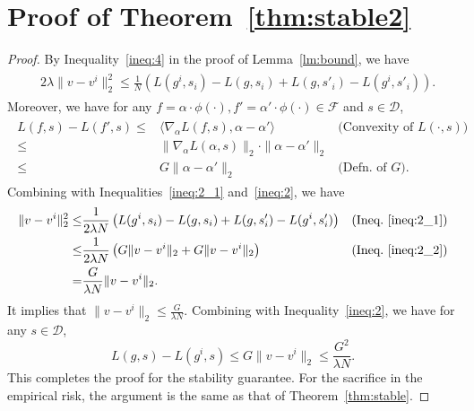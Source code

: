 \documentclass[11pt]{article}
\newcommand{\calD}{\mathcal{D}}
\newcommand{\calF}{\mathcal{F}}
\begin{document}
	
	
	
	
	\appendix
	
	\section{Proof of Theorem~\ref{thm:stable2}}
	\label{sec:proof2}
	
	\begin{proof}
		By Inequality~\eqref{ineq:4} in the proof of Lemma~\ref{lm:bound}, we have
		\begin{eqnarray}
		\label{ineq:2_1}
		\begin{split}
		& 2\lambda \|v-v^i\|_2^2
		\leq \frac{1}{N} \left(L(g^{i},s_i)-L(g,s_i) + L(g, s'_i)- L(g^i, s'_i) \right).
		\end{split}
		\end{eqnarray}
		Moreover, we have for any $f=\alpha\cdot \phi(\cdot),f'=\alpha'\cdot \phi(\cdot)\in \calF$ and $s\in \calD$,
		\begin{eqnarray}
		\label{ineq:2_2}
		\begin{split}
		L(f,s)-L(f',s) \leq & \langle \nabla_\alpha L(f,s) , \alpha-\alpha' \rangle 
		&\text{(Convexity of $L(\cdot,s)$)} \\
		\leq & \|\nabla_\alpha L(\alpha,s)\|_2 \cdot \|\alpha-\alpha'\|_2 & \\
		\leq & G\|\alpha-\alpha'\|_2 
		& \text{(Defn. of $G$)}.
		\end{split}
		\end{eqnarray}
		Combining with Inequalities~\eqref{ineq:2_1} and~\eqref{ineq:2}, we have
		\begin{eqnarray*}
			\begin{split}
				\|v-v^i\|_2^2 
				\leq & \frac{1}{2\lambda N} \left(L(g^{i},s_i)-L(g,s_i) + L(g, s'_i)- L(g^i, s'_i) \right) 
				&\text{(Ineq.~\eqref{ineq:2_1})} \\
				\leq & \frac{1}{2\lambda N} \left(G\|v-v^i\|_2 +G\|v-v^i\|_2\right) 
				&\text{(Ineq.~\eqref{ineq:2_2})} \\
				=&\frac{G}{\lambda N} \|v-v^i\|_2.&
			\end{split}
		\end{eqnarray*}
		It implies that $\|v-v^i\|_2\leq \frac{G}{\lambda N}$. 
		Combining with Inequality~\eqref{ineq:2}, we have for any $s\in \calD$,
		\[
		L(g,s)-L(g^i,s) \leq G\|v-v^i\|_2\leq \frac{G^2}{\lambda N}.
		\]
		This completes the proof for the stability guarantee.
		For the sacrifice in the empirical risk, the argument is the same as that of Theorem~\ref{thm:stable}.
	\end{proof}
	
\end{document}
